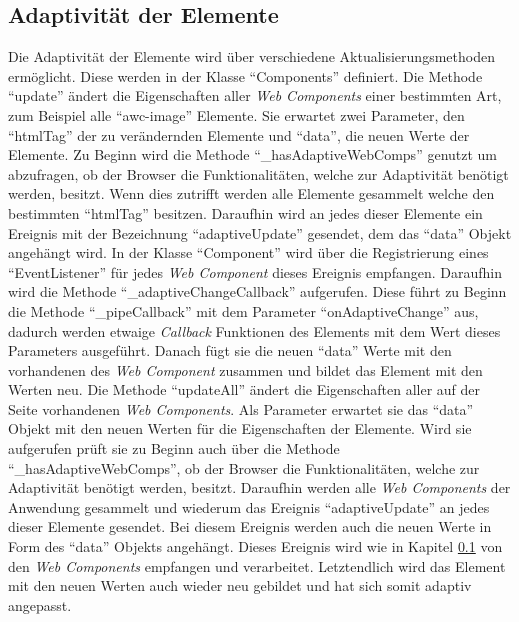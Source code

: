 \documentclass[12pt, paper=a4, bibtotoc, toc=listof, headsepline=true]{scrreprt}
\begin{document}
	\subsection{Adaptivität der Elemente}
	\label{sec:adaDerEle}
	Die Adaptivität der Elemente wird über verschiedene Aktualisierungsmethoden ermöglicht. Diese werden in der Klasse \enquote{Components} definiert. Die Methode \enquote{update} ändert die Eigenschaften aller \emph{Web Components} einer bestimmten Art, zum Beispiel alle \enquote{awc-image} Elemente. Sie erwartet zwei Parameter, den \enquote{htmlTag} der zu verändernden Elemente und \enquote{data}, die neuen Werte der Elemente. Zu Beginn wird die Methode \enquote{\_hasAdaptiveWebComps} genutzt um abzufragen, ob der Browser die Funktionalitäten, welche zur Adaptivität benötigt werden, besitzt. Wenn dies zutrifft werden alle Elemente gesammelt welche den bestimmten \enquote{htmlTag} besitzen. Daraufhin wird an jedes dieser Elemente ein Ereignis mit der Bezeichnung \enquote{adaptiveUpdate} gesendet, dem das \enquote{data} Objekt angehängt wird.
	In der Klasse \enquote{Component} wird über die Registrierung eines \enquote{EventListener} für jedes \emph{Web Component} dieses Ereignis empfangen. Daraufhin wird die Methode \enquote{\_adaptiveChangeCallback} aufgerufen. Diese führt zu Beginn die Methode \enquote{\_pipeCallback} mit dem Parameter \enquote{onAdaptiveChange} aus, dadurch werden etwaige \emph{Callback} Funktionen des Elements mit dem Wert dieses Parameters ausgeführt. Danach fügt sie die neuen \enquote{data} Werte mit den vorhandenen des \emph{Web Component} zusammen und bildet das Element mit den Werten neu.
	\newline
	Die Methode \enquote{updateAll} ändert die Eigenschaften aller auf der Seite vorhandenen \emph{Web Components}. Als Parameter erwartet sie das \enquote{data} Objekt mit den neuen Werten für die Eigenschaften der Elemente. Wird sie aufgerufen prüft sie zu Beginn auch über die Methode \enquote{\_hasAdaptiveWebComps}, ob der Browser die Funktionalitäten, welche zur Adaptivität benötigt werden, besitzt. Daraufhin werden alle \emph{Web Components} der Anwendung gesammelt und wiederum das Ereignis \enquote{adaptiveUpdate} an jedes dieser Elemente gesendet. Bei diesem Ereignis werden auch die neuen Werte in Form des \enquote{data} Objekts angehängt. Dieses Ereignis wird wie in Kapitel \ref{sec:adaDerEle} von den \emph{Web Components} empfangen und verarbeitet. Letztendlich wird das Element mit den neuen Werten auch wieder neu gebildet und hat sich somit adaptiv angepasst.
	\newline
\end{document}
